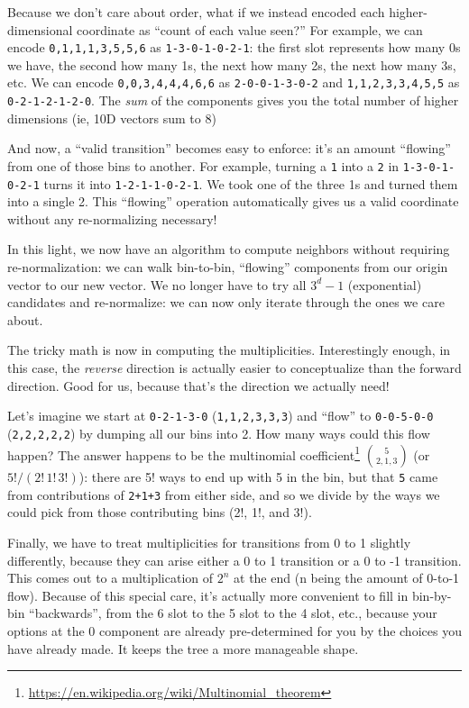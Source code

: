 \documentclass[]{article}
\renewcommand{\href}[2]{#2\footnote{\url{#1}}}
\begin{document}
Because we don't care about order, what if we instead encoded each
higher-dimensional coordinate as ``count of each value seen?'' For example, we
can encode \texttt{0,1,1,1,3,5,5,6} as \texttt{1-3-0-1-0-2-1}: the first slot
represents how many 0s we have, the second how many 1s, the next how many 2s,
the next how many 3s, etc. We can encode \texttt{0,0,3,4,4,4,6,6} as
\texttt{2-0-0-1-3-0-2} and \texttt{1,1,2,3,3,4,5,5} as \texttt{0-2-1-2-1-2-0}.
The \emph{sum} of the components gives you the total number of higher dimensions
(ie, 10D vectors sum to 8)

And now, a ``valid transition'' becomes easy to enforce: it's an amount
``flowing'' from one of those bins to another. For example, turning a \texttt{1}
into a \texttt{2} in \texttt{1-3-0-1-0-2-1} turns it into
\texttt{1-2-1-1-0-2-1}. We took one of the three 1s and turned them into a
single 2. This ``flowing'' operation automatically gives us a valid coordinate
without any re-normalizing necessary!

In this light, we now have an algorithm to compute neighbors without requiring
re-normalization: we can walk bin-to-bin, ``flowing'' components from our origin
vector to our new vector. We no longer have to try all \(3^d-1\) (exponential)
candidates and re-normalize: we can now only iterate through the ones we care
about.

The tricky math is now in computing the multiplicities. Interestingly enough, in
this case, the \emph{reverse} direction is actually easier to conceptualize than
the forward direction. Good for us, because that's the direction we actually
need!

Let's imagine we start at \texttt{0-2-1-3-0} (\texttt{1,1,2,3,3,3}) and ``flow''
to \texttt{0-0-5-0-0} (\texttt{2,2,2,2,2}) by dumping all our bins into 2. How
many ways could this flow happen? The answer happens to be the
\href{https://en.wikipedia.org/wiki/Multinomial_theorem}{multinomial
coefficient} \(5 \choose {2,1,3}\) (or \(5! / (2!\,1!\,3!)\)): there are 5! ways
to end up with 5 in the bin, but that \texttt{5} came from contributions of
\texttt{2+1+3} from either side, and so we divide by the ways we could pick from
those contributing bins (2!, 1!, and 3!).

Finally, we have to treat multiplicities for transitions from 0 to 1 slightly
differently, because they can arise either a 0 to 1 transition or a 0 to -1
transition. This comes out to a multiplication of \(2^n\) at the end (n being
the amount of 0-to-1 flow). Because of this special care, it's actually more
convenient to fill in bin-by-bin ``backwards'', from the 6 slot to the 5 slot to
the 4 slot, etc., because your options at the 0 component are already
pre-determined for you by the choices you have already made. It keeps the tree a
more manageable shape.
\end{document}
